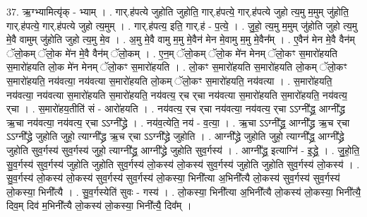 \documentclass[17pt]{extarticle}
\begin{document}
37. ऋ॒ग्भ्यामित्यृ॑क् - भ्याम् । . गार्.ह॑पत्ये जुहोति जुहोति॒ गार्.ह॑पत्ये॒ गार्.ह॑पत्ये जुहो त्य॒मु म॒मुम् जु॑होति॒ गार्.ह॑पत्ये॒ गार्.ह॑पत्ये जुहो त्य॒मुम् । . गार्.ह॑पत्य॒ इति॒ गार्.ह॑ - प॒त्ये॒ । . जु॒हो॒ त्य॒मु म॒मुम् जु॑होति जुहो त्य॒मु मे॒वै वामुम् जु॑होति जुहो त्य॒मु मे॒व । . अ॒मु मे॒वै वामु म॒मु मे॒वैन॑ मेन मे॒वामु म॒मु मे॒वैन᳚म् । . ए॒वैन॑ मेन मे॒वै वैन॑म् ॅलो॒कम् ॅलो॒क मे॑न मे॒वै वैन॑म् ॅलो॒कम् । . ए॒न॒म् ॅलो॒कम् ॅलो॒क मे॑न मेनम् ॅलो॒कꣳ स॒मारो॑हयति स॒मारो॑हयति लो॒क मे॑न मेनम् ॅलो॒कꣳ स॒मारो॑हयति । . लो॒कꣳ स॒मारो॑हयति स॒मारो॑हयति लो॒कम् ॅलो॒कꣳ स॒मारो॑हयति॒ नय॑वत्या॒ नय॑वत्या स॒मारो॑हयति लो॒कम् ॅलो॒कꣳ स॒मारो॑हयति॒ नय॑वत्या । . स॒मारो॑हयति॒ नय॑वत्या॒ नय॑वत्या स॒मारो॑हयति स॒मारो॑हयति॒ नय॑वत्य॒ र्‌च र्‌चा नय॑वत्या स॒मारो॑हयति स॒मारो॑हयति॒ नय॑वत्य॒ र्‌चा । . स॒मारो॑हय॒तीति॑ सं - आरो॑हयति । . नय॑वत्य॒ र्‌च र्‌चा नय॑वत्या॒ नय॑वत्य॒ र्‌चा ऽऽग्नी᳚द्ध्र॒ आग्नी᳚द्ध्र ऋ॒चा नय॑वत्या॒ नय॑वत्य॒ र्‌चा ऽऽग्नी᳚द्ध्रे । . नय॑व॒त्येति॒ नय॑ - व॒त्या॒ । . ऋ॒चा ऽऽग्नी᳚द्ध्र॒ आग्नी᳚द्ध्र ऋ॒च र्‌चा ऽऽग्नी᳚द्ध्रे जुहोति जुहो॒ त्याग्नी᳚द्ध्र ऋ॒च र्‌चा ऽऽग्नी᳚द्ध्रे जुहोति । . आग्नी᳚द्ध्रे जुहोति जुहो॒ त्याग्नी᳚द्ध्र॒ आग्नी᳚द्ध्रे जुहोति सुव॒र्गस्य॑ सुव॒र्गस्य॑ जुहो॒ त्याग्नी᳚द्ध्र॒ आग्नी᳚द्ध्रे जुहोति सुव॒र्गस्य॑ । . आग्नी᳚द्ध्र॒ इत्याग्नि॑ - इ॒द्ध्रे॒ । . जु॒हो॒ति॒ सु॒व॒र्गस्य॑ सुव॒र्गस्य॑ जुहोति जुहोति सुव॒र्गस्य॑ लो॒कस्य॑ लो॒कस्य॑ सुव॒र्गस्य॑ जुहोति जुहोति सुव॒र्गस्य॑ लो॒कस्य॑ । . सु॒व॒र्गस्य॑ लो॒कस्य॑ लो॒कस्य॑ सुव॒र्गस्य॑ सुव॒र्गस्य॑ लो॒कस्या॒ भिनी᳚त्या अ॒भिनी᳚त्यै लो॒कस्य॑ सुव॒र्गस्य॑ सुव॒र्गस्य॑ लो॒कस्या॒ भिनी᳚त्यै । . सु॒व॒र्गस्येति॑ सुवः - गस्य॑ । . लो॒कस्या॒ भिनी᳚त्या अ॒भिनी᳚त्यै लो॒कस्य॑ लो॒कस्या॒ भिनी᳚त्यै॒ दिव॒म् दिव॑ म॒भिनी᳚त्यै लो॒कस्य॑ लो॒कस्या॒ भिनी᳚त्यै॒ दिव᳚म् । \newline
\end{document}
